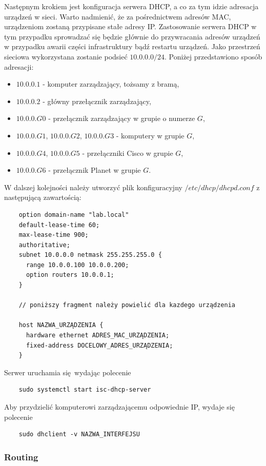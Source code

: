 \documentclass[polish,envcountsect,10pt]{article}
\begin{document}
Następnym krokiem jest konfiguracja serwera DHCP, a co za tym idzie adresacja urządzeń w sieci. Warto nadmienić, że za pośrednictwem adresów MAC, urządzeniom zostaną przypisane stałe adresy IP. Zastosowanie serwera DHCP w tym przypadku sprowadzać się będzie głównie do przywracania adresów urządzeń w przypadku awarii części infrastruktury bądź restartu urządzeń. Jako przestrzeń sieciowa wykorzystana zostanie podsieć $10.0.0.0/24$. Poniżej przedstawiono sposób adresacji:
\begin{itemize}
	\item $10.0.0.1$ - komputer zarządzający, tożsamy z bramą,
	\item $10.0.0.2$ - główny przełącznik zarządzający,
	\item $10.0.0.G0$ - przełącznik zarządzający w grupie o numerze $G$,
	\item $10.0.0.G1$, $10.0.0.G2$, $10.0.0.G3$ - komputery w grupie $G$,
	\item $10.0.0.G4$, $10.0.0.G5$ - przełączniki Cisco w grupie $G$,
	\item $10.0.0.G6$ - przełącznik Planet w grupie $G$.
\end{itemize}
W dalszej kolejności należy utworzyć plik konfiguracyjny $/etc/dhcp/dhcpd.conf$ z następującą zawartością:
\begin{verbatim}
	option domain-name "lab.local"
	default-lease-time 60;
	max-lease-time 900;
	authoritative;
	subnet 10.0.0.0 netmask 255.255.255.0 {
	  range 10.0.0.100 10.0.0.200;
	  option routers 10.0.0.1;
	}

	// poniższy fragment należy powielić dla kazdego urządzenia

	host NAZWA_URZĄDZENIA {
	  hardware ethernet ADRES_MAC_URZĄDZENIA;
	  fixed-address DOCELOWY_ADRES_URZĄDZENIA;
	}
\end{verbatim}
Serwer uruchamia się wydając polecenie
\begin{verbatim}
	sudo systemctl start isc-dhcp-server
\end{verbatim}
Aby przydzielić komputerowi zarządzającemu odpowiednie IP, wydaje się polecenie
\begin{verbatim}
	sudo dhclient -v NAZWA_INTERFEJSU
\end{verbatim}

\subsubsection{Routing}
\end{document}
